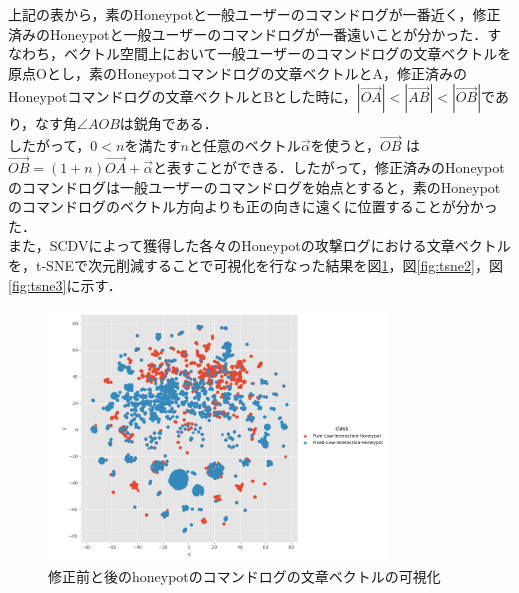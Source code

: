 上記の表から，素のHoneypotと一般ユーザーのコマンドログが一番近く，修正済みのHoneypotと一般ユーザーのコマンドログが一番遠いことが分かった．すなわち，ベクトル空間上において一般ユーザーのコマンドログの文章ベクトルを原点Oとし，素のHoneypotコマンドログの文章ベクトルとA，修正済みのHoneypotコマンドログの文章ベクトルとBとした時に，$ |\vec{OA}| < |\vec{AB}| < |\vec{OB}| $であり，なす角$ \angle AOB $は鋭角である．\\
したがって，$ 0 < n $を満たす$ n $と任意のベクトル$ \vec{\alpha} $を使うと，$ \vec{OB} $ は $ \vec{OB} = (1+n)\vec{OA} + \vec{\alpha} $と表すことができる．したがって，修正済みのHoneypotのコマンドログは一般ユーザーのコマンドログを始点とすると，素のHoneypotのコマンドログのベクトル方向よりも正の向きに遠くに位置することが分かった．\\

また，SCDVによって獲得した各々のHoneypotの攻撃ログにおける文章ベクトルを，t-SNEで次元削減することで可視化を行なった結果を図\ref{fig:tsne1}，図\ref{fig:tsne2}，図\ref{fig:tsne3}に示す．
\clearpage

\vspace{10mm}
\begin{figure}[htbp]
    \centering
    \includegraphics[width=0.8\textwidth]{figures/sufix.png}
    \caption{修正前と後のhoneypotのコマンドログの文章ベクトルの可視化}
    \label{fig:tsne1}
\end{figure}
\vspace{10mm}


